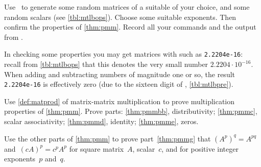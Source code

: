 \begin{exercise}  
Use \script\ to generate some random matrices of a suitable  of your choice, and some random scalars (see \cref{tbl:mtlbops}).
Choose some suitable exponents.
Then confirm the  properties of \cref{thm:pmm}.
Record all your commands and the output from \script.

In checking some properties you may get matrices with  such as \verb|2.2204e-16|: recall from \cref{tbl:mtlbops} that this denotes the very small number \(2.2204\cdot10^{-16}\). 
When adding and subtracting numbers of magnitude one or so, the result \verb|2.2204e-16| is effectively zero (due to the sixteen digit  of \script, \cref{tbl:mtlbpre}).
\end{exercise}

\begin{exercise}  
Use \cref{def:matprod} of matrix-matrix multiplication to prove multiplication properties of \cref{thm:pmm}. 
Prove parts: \ref{thm:pmmbb}, distributivity; \ref{thm:pmmc}, scalar associativity; \ref{thm:pmmd}, identity; \ref{thm:pmme}, zeros.
\end{exercise}

\begin{exercise}  
Use the other parts of \cref{thm:pmm} to prove part~\ref{thm:pmmg} that \((A^p)^q=A^{pq}\) and~\((cA)^p=c^pA^p\) for square matrix~\(A\), scalar~\(c\), and for positive integer exponents~\(p\) and~\(q\).
\end{exercise}

